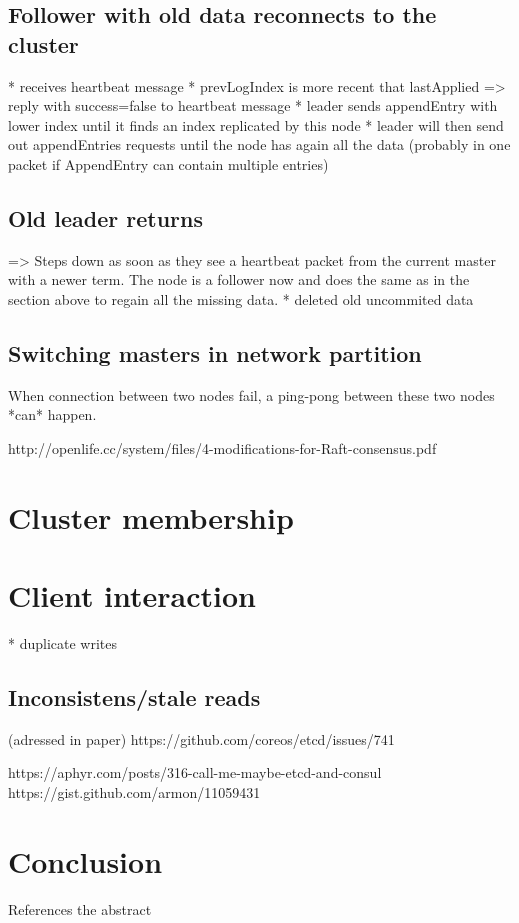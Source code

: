 \subsection{Follower with old data reconnects to the cluster}
* receives heartbeat message
* prevLogIndex is more recent that lastApplied => reply with success=false to heartbeat message
* leader sends appendEntry with lower index until it finds an index replicated by this node
* leader will then send out appendEntries requests until the node has again all the data (probably in one packet if AppendEntry can contain multiple entries)

\subsection{Old leader returns}
=> Steps down as soon as they see a heartbeat packet from the current master with a newer term.
The node is a follower now and does the same as in the section above to regain all the missing data.
* deleted old uncommited data

\subsection{Switching masters in network partition}
When connection between two nodes fail, a ping-pong between these two nodes *can* happen.

http://openlife.cc/system/files/4-modifications-for-Raft-consensus.pdf

\section{Cluster membership}

\section{Client interaction}

* duplicate writes



\subsection{Inconsistens/stale reads}
(adressed in paper)
https://github.com/coreos/etcd/issues/741

https://aphyr.com/posts/316-call-me-maybe-etcd-and-consul
https://gist.github.com/armon/11059431

\section{Conclusion}
References the abstract


 


